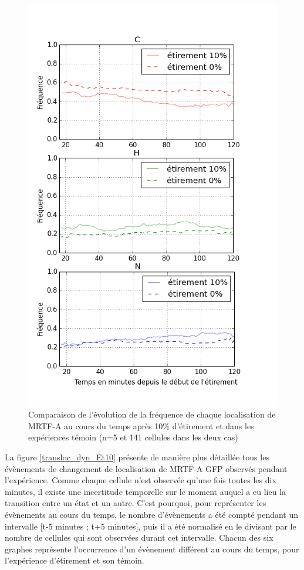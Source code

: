 \begin{figure}
\includegraphics[scale=0.4]{Figures/Etirement10_vs_0_dynamique.png} 
\caption{\label{CHN_dyn_Et10} Comparaison de l'évolution de la fréquence de chaque localisation de MRTF-A au cours du temps après 10\% d'étirement et dans les expériences témoin (n=5 et 141 cellules dans les deux cas)}
\end{figure}

La figure \ref{transloc_dyn_Et10} présente de manière plus détaillée tous les évènements de changement de localisation de MRTF-A GFP observés pendant l'expérience. 
Comme chaque cellule n'est observée qu'une fois toutes les dix minutes, il existe une incertitude temporelle sur le moment auquel a eu lieu la transition entre un état et un autre. C'est pourquoi, pour représenter les évènements au cours du temps, le nombre d'évènements a été compté pendant un intervalle [t-5 minutes ; t+5 minutes], puis il a été normalisé en le divisant par le nombre de cellules qui sont observées durant cet intervalle. 
Chacun des six graphes représente l'occurrence d'un évènement différent au cours du temps, pour l'expérience d'étirement et son témoin. 

